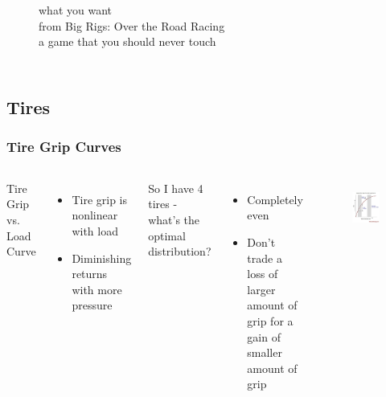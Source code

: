 \documentclass{beamer}
\begin{document}
\begin{frame}
\begin{columns}[t]
\begin{figure}
{    what you want \\
    {\tiny from Big Rigs: Over the Road Racing} \\ 
    {\tiny a game that you should never touch}
    }
  \end{figure}
\end{columns}
\end{frame}

\subsection{Tires}

\begin{frame}
\frametitle{Tire Grip Curves}
\begin{columns}[t]
  Tire Grip vs. Load Curve
  \begin{itemize}
    \item Tire grip is nonlinear with load
    \item Diminishing returns with more pressure
  \end{itemize}
  \vspace{\baselineskip}
  So I have 4 tires - what's the optimal distribution?
   {
  \begin{itemize}
    \item Completely even
    \item Don't trade a loss of larger amount of grip for a gain of smaller amount of grip
  \end{itemize}
  }
  \begin{figure}
    \centering
    \includegraphics[width=1.0\columnwidth]{images-dis12/tire_load_curve} \\

\end{figure}
\end{columns}
\end{frame}
\end{document}
